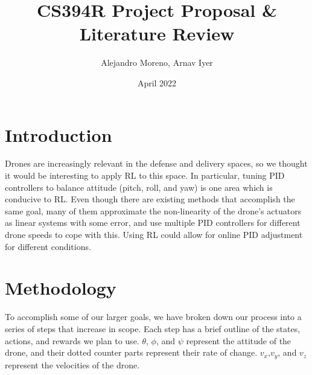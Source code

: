 \documentclass{article}
\title{CS394R Project Proposal & Literature Review}
\author{Alejandro Moreno, Arnav  Iyer}
\date{April 2022}
\begin{document}
\maketitle

\section{Introduction}


Drones are increasingly relevant in the defense and delivery spaces, so we thought it would be interesting to apply RL to this space. In particular, tuning PID controllers to balance attitude (pitch, roll, and yaw) is one area which is conducive to RL. Even though there are existing methods that accomplish the same goal, many of them approximate the non-linearity of the drone's actuators as linear systems with some error, and use multiple PID controllers for different drone speeds to cope with this. Using RL could allow for online PID adjustment for different conditions.

\section{Methodology}


To accomplish some of our larger goals, we have broken down our process into a series of steps that increase in scope. Each step has a brief outline of the states, actions, and rewards we plan to use. $\theta$, $\phi$, and $\psi$ represent the attitude of the drone, and their dotted counter parts represent their rate of change. $v_x$,$v_y$, and $v_z$ represent the velocities of the drone.
\end{document}
